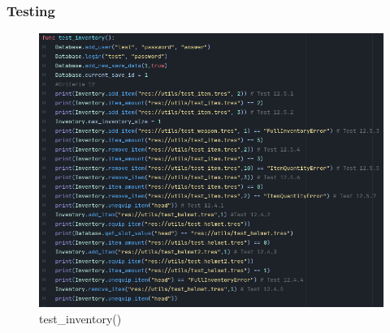 \documentclass{article}
\begin{document}
        \subsubsection{Testing}
        \begin{figure}[H]
                \centering
                \includegraphics[width=0.8\columnwidth]{images/development/test_inventory.PNG}
                \caption{test\_inventory()}
        \end{figure}
\end{document}
